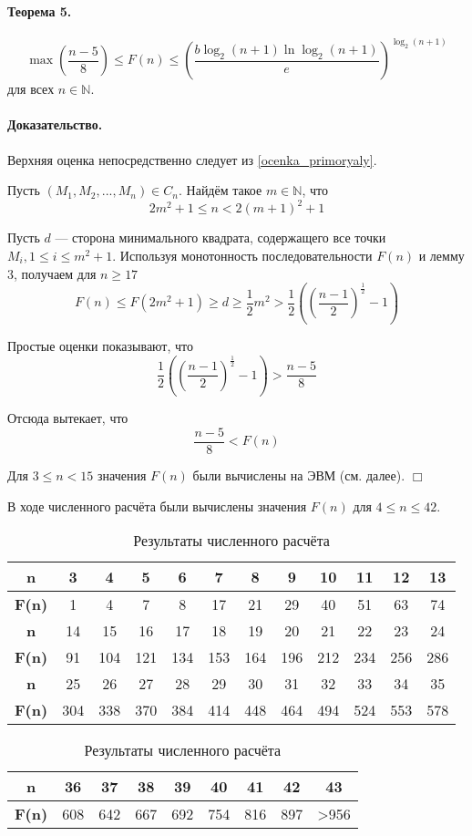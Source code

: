 \documentclass[a4paper,14pt]{article} %
\begin{document}
\paragraph{Теорема 5.}

$$
 \max\left( \frac{n-5}{8} \right) \leq F(n) \leq \left( \frac{b \log_2(n+1) \ln \log_2 (n+1)}{e}\right)^{\log_2(n+1)}
$$
для всех $n\in\mathbb{N}$.

\paragraph{Доказательство.}
Верхняя оценка непосредственно следует из \ref{ocenka_primoryaly}.

Пусть $\left(M_1, M_2, ..., M_n\right) \in C_n$.
Найдём такое $m\in \mathbb{N}$, что
$$
2m^2+1 \leq n < 2(m+1)^2 +1
$$

Пусть $d$ --- сторона минимального квадрата, содержащего все точки $M_i, 1\leq i \leq m^2+1$.
Используя монотонность последовательности $F(n)$ и лемму 3, получаем для $n\geq 17$
$$
F(n) \leq F\left(2m^2+1\right)\geq d \geq \frac{1}{2}m^2 > \frac{1}{2}\left(\left(\frac{n-1}{2}\right)^\frac{1}{2} - 1 \right)
$$

Простые оценки показывают, что
$$
\frac{1}{2}\left(\left(\frac{n-1}{2}\right)^\frac{1}{2} -1 \right) > \frac{n-5}{8}
$$

Отсюда вытекает, что
$$
\frac{n-5}{8}<F(n)
$$

Для $3 \leq n < 15$ значения $F(n)$ были вычислены на ЭВМ (см. далее).
$\Box$

В ходе численного расчёта были вычислены значения $F(n)$ для $4\leq n \leq 42$.

\begin{table}[H]
\caption{Результаты численного расчёта}
\label{tabular:pc_counted}
\begin{center}
\begin{tabular}{|c|c|c|c|c|c|c|c|c|c|c|c|}
\hline
\textbf{n}    &  3 & 4 & 5 & 6 &  7 &  8 &  9 & 10 & 11 & 12 & 13 \\
\hline
\textbf{F(n)} &  1 & 4 & 7 & 8 & 17 & 21 & 29 & 40 & 51 & 63 & 74  \\
\hline
\hline
\textbf{n}    &  14 &  15 &  16 &  17 &  18 &  19 &  20 &  21 &  22 &  23 &  24 \\
\hline
\textbf{F(n)} &  91 & 104 & 121 & 134 & 153 & 164 & 196 & 212 & 234 & 256 & 286  \\
\hline
\hline
\textbf{n}    &  25 &  26 &  27 &  28 &  29 &  30 &  31 &  32 &  33 &  34 &  35 \\
\hline
\textbf{F(n)} & 304 & 338 & 370 & 384 & 414 & 448 & 464 & 494 & 524 & 553 & 578  \\
\hline
\end{tabular}
\begin{tabular}{|c|c|c|c|c|c|c|c|c|}
\hline
\textbf{n}    &  36 &  37 &  38 &  39 &  40 &  41 &  42 &  43  \\
\hline
\textbf{F(n)} & 608 & 642 & 667 & 692 & 754 & 816 & 897 & >956  \\
\hline
\end{tabular}
\end{center}
\end{table}
\end{document}
